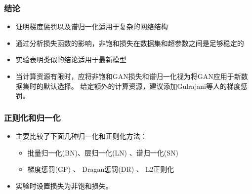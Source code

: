 \documentclass{beamer}
\begin{document}
\begin{frame}[c]\frametitle{结论}
    \begin{itemize}
        \item 证明梯度惩罚以及谱归一化适用于复杂的网络结构
        \item 通过分析损失函数的影响，非饱和损失在数据集和超参数之间是足够稳定的
        \item 实验表明类似的结论适用于最新模型
        \item 当计算资源有限时，应将非饱和GAN损失和谱归一化视为将GAN应用于新数据集时的默认选择。 
                给定额外的计算资源，建议添加Gulrajani等人的梯度惩罚。
    \end{itemize}
\end{frame}

\begin{frame}[c]\frametitle{正则化和归一化}
    \begin{itemize}
        \item 主要比较了下面几种归一化和正则化方法：
        \begin{itemize}
            \item 批量归一化(BN)、层归一化(LN) 、谱归一化(SN)
            \item 梯度惩罚(GP) 、 Dragan惩罚(DR) 、 L2正则化
        \end{itemize}
        \item 实验时设置损失为非饱和损失。
    \end{itemize}
\end{frame}
\end{document}
